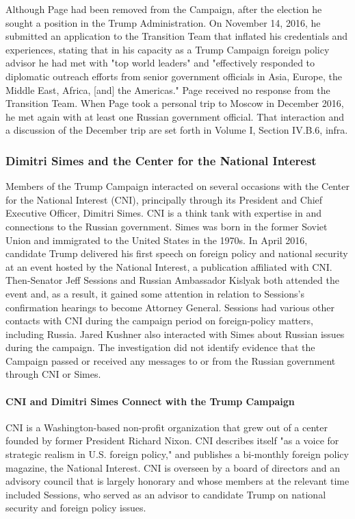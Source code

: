 Although Page had been removed from the Campaign, after the election he sought a position in the Trump Administration.%
On November 14, 2016, he submitted an application to the Transition Team that inflated his credentials and experiences, stating that in his capacity as a Trump Campaign foreign policy advisor he had met with "top world leaders" and "effectively responded to diplomatic outreach efforts from senior government officials in Asia, Europe, the Middle East, Africa, [and] the Americas."%
Page received no response from the Transition Team.
When Page took a personal trip to Moscow in December 2016, he met again with at least one Russian government official.
That interaction and a discussion of the December trip are set forth in Volume I, Section IV.B.6, infra.

\subsubsection{Dimitri Simes and the Center for the National Interest}

Members of the Trump Campaign interacted on several occasions with the Center for the National Interest (CNI), principally through its President and Chief Executive Officer, Dimitri Simes.
CNI is a think tank with expertise in and connections to the Russian government.
Simes was born in the former Soviet Union and immigrated to the United States in the 1970s.
In April 2016, candidate Trump delivered his first speech on foreign policy and national security at an event hosted by the National Interest, a publication affiliated with CNI.
Then-Senator Jeff Sessions and Russian Ambassador Kislyak both attended the event and, as a result, it gained some attention in relation to Sessions's confirmation hearings to become Attorney General.
Sessions had various other contacts with CNI during the campaign period on foreign-policy matters, including Russia.
Jared Kushner also interacted with Simes about Russian issues during the campaign.
The investigation did not identify evidence that the Campaign passed or received any messages to or from the Russian government through CNI or Simes.

\paragraph{CNI and Dimitri Simes Connect with the Trump Campaign}

CNI is a Washington-based non-profit organization that grew out of a center founded by former President Richard Nixon.%
CNI describes itself "as a voice for strategic realism in U.S. foreign policy," and publishes a bi-monthly foreign policy magazine, the National Interest.%
CNI is overseen by a board of directors and an advisory council that is largely honorary and whose members at the relevant time included Sessions, who served as an advisor to candidate Trump on national security and foreign policy issues.%

